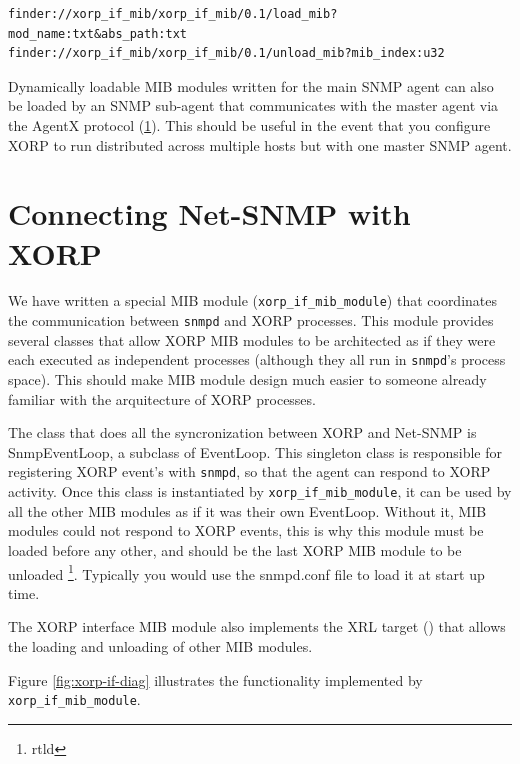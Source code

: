 \documentclass[11pt]{article}
\begin{document}
\begin{ttfamily}
\begin{verbatim}
finder://xorp_if_mib/xorp_if_mib/0.1/load_mib?mod_name:txt&abs_path:txt
finder://xorp_if_mib/xorp_if_mib/0.1/unload_mib?mib_index:u32
\end{verbatim}
\end{ttfamily}

Dynamically loadable MIB modules written for the main SNMP agent can also be
loaded by an SNMP sub-agent that communicates with the master agent via the
AgentX protocol (\ref{}).  This should be useful in the event that you
configure XORP to run distributed across multiple hosts but with one 
master SNMP agent.  


\section{Connecting Net-SNMP with XORP}


We have written a special MIB module (\texttt{xorp\_if\_mib\_module}) that
coordinates the communication between \texttt{snmpd} and XORP processes.  This
module provides several classes that allow XORP MIB modules to be architected
as if they were each executed as independent processes (although they all run
in \texttt{snmpd}'s process space).  This should make MIB module design much easier to someone already familiar with the arquitecture of XORP processes.
 
The class that does all the syncronization between XORP and Net-SNMP 
is SnmpEventLoop, a subclass of EventLoop.  This singleton class is
responsible for registering XORP event's with \texttt{snmpd}, so that the agent
can respond to XORP activity.  Once this class is instantiated by
\texttt{xorp\_if\_mib\_module}, it can be used by all the other MIB modules as
if it was their own EventLoop.  Without it, MIB modules could not respond to
XORP events, this is why this module must be loaded before any other, and
should be the last XORP MIB module to be unloaded \footnote{rtld}.  Typically you would use the snmpd.conf file to load it at start up time.  

The XORP interface MIB module also implements the XRL target (\cite{}) that
allows the loading and unloading of other MIB modules.  


Figure \ref{fig:xorp-if-diag} illustrates the functionality implemented by 
\texttt{xorp\_if\_mib\_module}.
\end{document}
